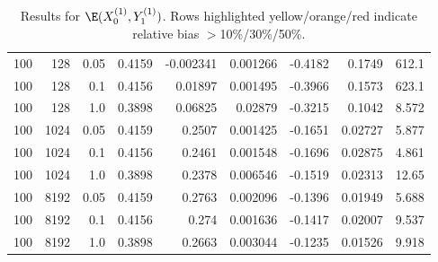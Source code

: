\documentclass{article}
\begin{document}
\begin{table}[htbp]
\begin{tabular}{rrr|rrrrrr}
\rowcolor{red!40}100 & 128 & 0.05 & 0.4159 & -0.002341 & 0.001266 & -0.4182 & 0.1749 & 612.1 \\
\rowcolor{red!40}100 & 128 & 0.1 & 0.4156 & 0.01897 & 0.001495 & -0.3966 & 0.1573 & 623.1 \\
\rowcolor{red!40}100 & 128 & 1.0 & 0.3898 & 0.06825 & 0.02879 & -0.3215 & 0.1042 & 8.572 \\
\midrule
\rowcolor{orange!50}100 & 1024 & 0.05 & 0.4159 & 0.2507 & 0.001425 & -0.1651 & 0.02727 & 5.877 \\
\rowcolor{orange!50}100 & 1024 & 0.1 & 0.4156 & 0.2461 & 0.001548 & -0.1696 & 0.02875 & 4.861 \\
\rowcolor{orange!50}100 & 1024 & 1.0 & 0.3898 & 0.2378 & 0.006546 & -0.1519 & 0.02313 & 12.65 \\
\midrule
\rowcolor{orange!50}100 & 8192 & 0.05 & 0.4159 & 0.2763 & 0.002096 & -0.1396 & 0.01949 & 5.688 \\
\rowcolor{orange!50}100 & 8192 & 0.1 & 0.4156 & 0.274 & 0.001636 & -0.1417 & 0.02007 & 9.537 \\
\rowcolor{orange!50}100 & 8192 & 1.0 & 0.3898 & 0.2663 & 0.003044 & -0.1235 & 0.01526 & 9.918 \\
\bottomrule
\end{tabular}
\caption{Results for $\E(X_0^{(1)}, Y_1^{(1)})$. Rows highlighted yellow/orange/red indicate relative bias $>$10\%/30\%/50\%.}
\label{tab:x0y1}
\end{table}
\end{document}
